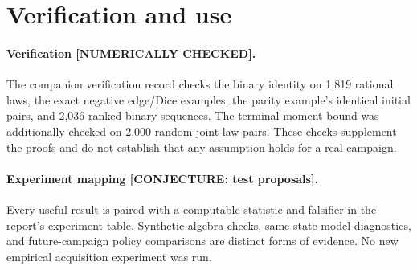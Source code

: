 \documentclass[11pt]{article}
\theoremstyle{definition}
\theoremstyle{remark}
\begin{document}
\section*{Verification and use}
\paragraph{Verification [NUMERICALLY CHECKED].}
The companion verification record checks the binary identity on 1,819
rational laws, the exact negative edge/Dice examples, the parity
example's identical initial pairs, and 2,036 ranked binary sequences.
The terminal moment bound was additionally checked on 2,000 random
joint-law pairs. These checks supplement the proofs and do not
establish that any assumption holds for a real campaign.
\paragraph{Experiment mapping [CONJECTURE: test proposals].}
Every useful result is paired with a computable statistic and falsifier
in the report's experiment table. Synthetic algebra checks, same-state
model diagnostics, and future-campaign policy comparisons are distinct
forms of evidence. No new empirical acquisition experiment was run.
\end{document}
